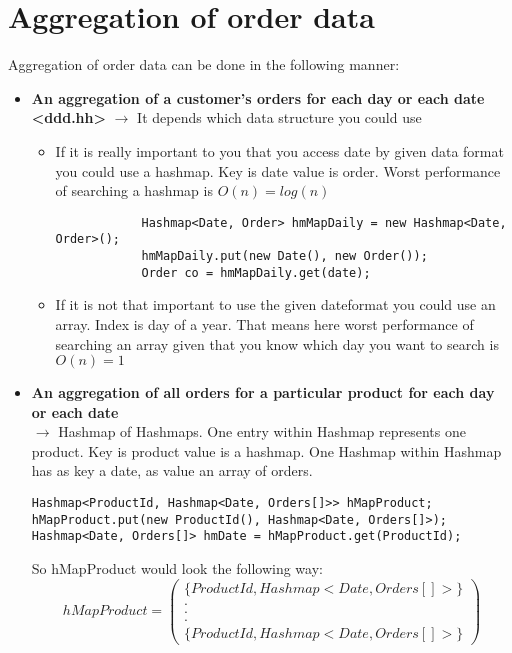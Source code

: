 \section{Aggregation of order data}
Aggregation of order data can be done in the following manner:
\begin{itemize}
    \item \textbf{An aggregation of a customer’s orders for each day or each date <ddd.hh>} $\rightarrow$ It depends which data structure you could use
    \begin{itemize}
        \item If it is really important to you that you access date by given data format you could use a hashmap. Key is date value is order.
        Worst performance of searching a hashmap is $O(n) = log(n)$
        {\footnotesize \begin{lstlisting}
            Hashmap<Date, Order> hmMapDaily = new Hashmap<Date, Order>();
            hmMapDaily.put(new Date(), new Order());
            Order co = hmMapDaily.get(date);
        \end{lstlisting}}
        \item If it is not that important to use the given dateformat you could use an array. Index is day of a year. That means here worst performance of searching an array
        given that you know which day you want to search is $O(n) = 1$
    \end{itemize}
    \item \textbf{An aggregation of all orders for a particular product for each day or each date} \\ $\rightarrow$
    Hashmap of Hashmaps. One entry within Hashmap represents one product. Key is product value is a hashmap. One Hashmap within Hashmap has
    as key a date, as value an array of orders.
{\footnotesize \begin{lstlisting}
Hashmap<ProductId, Hashmap<Date, Orders[]>> hMapProduct;
hMapProduct.put(new ProductId(), Hashmap<Date, Orders[]>);
Hashmap<Date, Orders[]> hmDate = hMapProduct.get(ProductId);
\end{lstlisting}}
    So hMapProduct would look the following way:
    \[hMapProduct = \begin{pmatrix}
    \{ProductId, Hashmap<Date, Orders[]>\} \\
         . \\
         . \\
         . \\
    \{ProductId, Hashmap<Date, Orders[]>\}
    \end{pmatrix}\]
\end{itemize}

